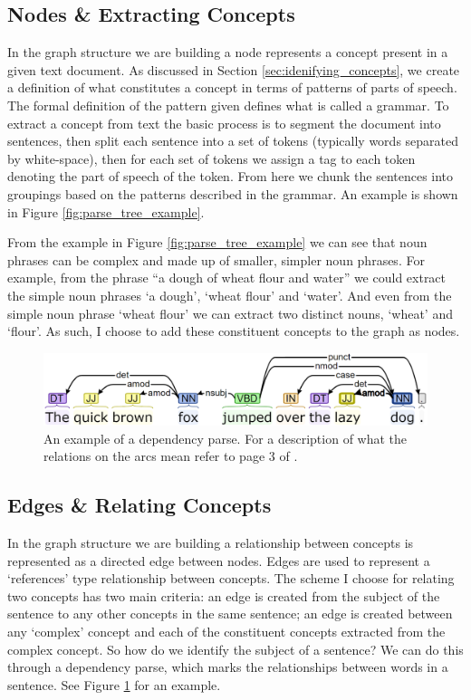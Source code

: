 \documentclass[12pt]{article}
\begin{document}
\subsection{Nodes \& Extracting Concepts}
In the graph structure we are building a node represents a concept present in a given text document. As discussed in Section \ref{sec:idenifying_concepts}, we create a definition of what constitutes a concept in terms of patterns of parts of speech. The formal definition of the pattern given defines what is called a grammar. To extract a concept from text the basic process is to segment the document into sentences, then split each sentence into a set of tokens (typically words separated by white-space), then for each set of tokens we assign a tag to each token denoting the part of speech of the token. From here we chunk the sentences into groupings based on the patterns described in the grammar. An example is shown in Figure \ref{fig:parse_tree_example}.

From the example in Figure \ref{fig:parse_tree_example} we can see that noun phrases can be complex and made up of smaller, simpler noun phrases. For example, from the phrase ``a dough of wheat flour and water'' we could extract the simple noun phrases `a dough', `wheat flour' and `water'. And even from the simple noun phrase `wheat flour' we can extract two distinct nouns, `wheat' and `flour'.  As such, I choose to add these constituent concepts to the graph as nodes.

\begin{figure}
    \centering
    \includegraphics[width=\linewidth]{figures/dependency_parse.png}
    \caption{An example of a dependency parse.\protect\footnotemark 
    For a description of what the relations on the arcs mean refer to page 3 of \citep{martin2009speech}.}
    \label{fig:dependency_parse_example}
\end{figure}

\subsection{Edges \& Relating Concepts}
In the graph structure we are building a relationship between concepts is represented as a directed edge between nodes. Edges are used to represent a `references' type relationship between concepts. The scheme I choose for relating two concepts has two main criteria: an edge is created from the subject of the sentence to any other concepts in the same sentence; an edge is created between any `complex' concept and each of the constituent concepts extracted from the complex concept. So how do we identify the subject of a sentence? We can do this through a dependency parse, which marks the relationships between words in a sentence. See Figure \ref{fig:dependency_parse_example} for an example. 
\end{document}
